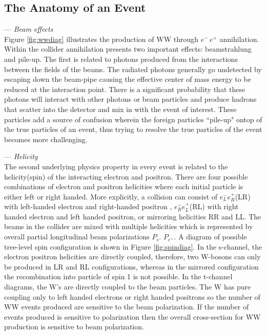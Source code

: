 \subsection{The Anatomy of an Event}
\label{subsec:collphsx}
--- \textit{Beam effects}\\
Figure \ref{fig:wwdiag} illustrates the production of WW through  $e^- \, e^+$ annihilation. Within the collider annihilation presents two important effects: beamstrahlung and pile-up. The first is related to photons produced from the interactions between the fields of the beams. The radiated photons generally go undetected by escaping down the beam-pipe causing the effective center of mass energy to be reduced at the interaction point. There is a significant probability that these photons will interact with other photons or beam particles and produce hadrons that scatter into the detector and mix in with the event of interest. These particles add a source of confusion wherein the foreign particles ``pile-up"  ontop of the true particles of an event, thus  trying to resolve the true particles of the event becomes more challenging. 

--- \textit{Helicity}\\
The second underlying physics property in every event is related to the helicity(spin) of the interacting electron and positron. There are four possible combinations of electron and positron helicities where each initial particle is either left or right handed. More explicitly, a collision can consist of  $e^-_L e^+_R$(LR) with left-handed electron and right-handed positron , $e^-_R e^+_L$(RL)  with right handed electron and left handed positron, or mirroring helicities RR and LL.  The beams in the collider are mixed with multiple helicities which is represented by overall partial longitudinal beam polarizations $P_{e^-} \, P_{e^+}$. A diagram of possible tree-level spin configuration is shown in Figure \ref{fig:spindiag}. In the s-channel, the electron positron helicities  are directly coupled, therefore, two W-bosons can only be produced in LR and RL configurations, whereas in the mirrored configuration the  recombination into particle of spin 1 is  not possible. In the t-channel diagrams, the W's are directly coupled to the beam particles. The W has pure coupling only to left handed electrons or right handed positrons so the number of  WW events produced are sensitive to the beam polarization\cite{thomson}.  If the number of events produced is sensitive to polarization then the overall cross-section for WW production is sensitive to beam polarization. 


